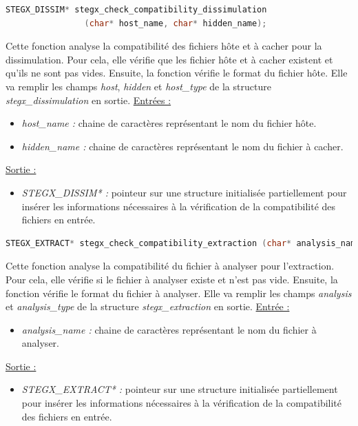\documentclass[11pt]{article}
\begin{document}
\begin{lstlisting}[language=c]
STEGX_DISSIM* stegx_check_compatibility_dissimulation 
                (char* host_name, char* hidden_name);
\end{lstlisting}

Cette fonction analyse la compatibilité des fichiers hôte et à cacher pour
la dissimulation. 
Pour cela, elle vérifie que les fichier hôte et à cacher existent et qu'ils 
ne sont pas vides. Ensuite, la fonction vérifie le format du fichier hôte. 
Elle va remplir les champs \textit{host}, \textit{hidden} et \textit{host\_type} 
de la structure \textit{stegx\_dissimulation} en sortie. 
\newline
\underline{Entrées :}
\begin{itemize}
\item \textit{host\_name :} chaine de caractères représentant le nom du fichier hôte.
\item \textit{hidden\_name :} chaine de caractères représentant le nom du 
fichier à cacher. 
\end{itemize}
\underline{Sortie :}
\begin{itemize}
\item \textit{STEGX\_DISSIM* :} pointeur sur une structure initialisée 
partiellement pour insérer les informations nécessaires à la vérification 
de la compatibilité des fichiers en entrée. 
\newline 
\end{itemize}

\begin{lstlisting}[language=c]
STEGX_EXTRACT* stegx_check_compatibility_extraction (char* analysis_name);
\end{lstlisting}

Cette fonction analyse la compatibilité du fichier à analyser pour l'extraction. 
Pour cela, elle vérifie si le fichier à analyser existe et n'est pas vide. 
Ensuite, la fonction vérifie le format du fichier à analyser. 
Elle va remplir les champs \textit{analysis} et \textit{analysis\_type} 
de la structure \textit{stegx\_extraction} en sortie. 
\newline
\underline{Entrée :}
\begin{itemize}
\item \textit{analysis\_name :} chaine de caractères représentant le nom du fichier 
à analyser.
\end{itemize}
\underline{Sortie :}
\begin{itemize}
\item \textit{STEGX\_EXTRACT* :} pointeur sur une structure initialisée 
partiellement pour insérer les informations nécessaires à la vérification 
de la compatibilité des fichiers en entrée. 
\newline 
\end{itemize}
\end{document}
